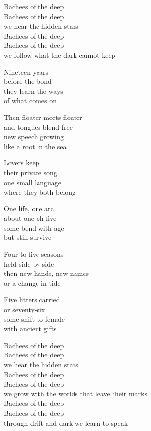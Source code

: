 \begin{lyrics}
Bachees of the deep\\
Bachees of the deep\\
we hear the hidden stars\\
Bachees of the deep\\
Bachees of the deep\\
we follow what the dark cannot keep

Nineteen years\\
before the bond\\
they learn the ways\\
of what comes on

Then floater meets floater\\
and tongues blend free\\
new speech growing\\
like a root in the sea

Lovers keep\\
their private song\\
one small language\\
where they both belong

One life, one arc\\
about one-oh-five\\
some bend with age\\
but still survive

Four to five seasons\\
held side by side\\
then new hands, new names\\
or a change in tide

Five litters carried\\
or seventy-six\\
some shift to female\\
with ancient gifts

Bachees of the deep\\
Bachees of the deep\\
we hear the hidden stars\\
Bachees of the deep\\
Bachees of the deep\\
we grow with the worlds that leave their marks\\
Bachees of the deep\\
Bachees of the deep\\
through drift and dark we learn to speak
\end{lyrics}

